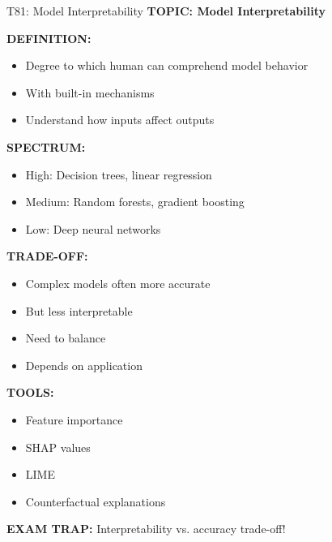 \documentclass[8pt]{beamer}
\begin{document}
	\begin{frame}{T81: Model Interpretability}
		\fontsize{6.5}{7.5}\selectfont
		\textbf{TOPIC: Model Interpretability}
		
		\vspace{0.1cm}
		\textbf{DEFINITION:}
		\begin{itemize}
			\item Degree to which human can comprehend model behavior
			\item With built-in mechanisms
			\item Understand how inputs affect outputs
		\end{itemize}
		
		\vspace{0.1cm}
		\textbf{SPECTRUM:}
		\begin{itemize}
			\item \textcolor{myblue}{High:} Decision trees, linear regression
			\item \textcolor{myblue}{Medium:} Random forests, gradient boosting
			\item \textcolor{myblue}{Low:} Deep neural networks
		\end{itemize}
		
		\vspace{0.1cm}
		\textbf{TRADE-OFF:}
		\begin{itemize}
			\item Complex models often more accurate
			\item But less interpretable
			\item Need to balance
			\item Depends on application
		\end{itemize}
		
		\vspace{0.1cm}
		\textbf{TOOLS:}
		\begin{itemize}
			\item Feature importance
			\item SHAP values
			\item LIME
			\item Counterfactual explanations
		\end{itemize}
		
		\textcolor{myred}{\textbf{EXAM TRAP:}} Interpretability vs. accuracy \textcolor{myblue}{trade-off}!
	\end{frame}
	
\end{document}
